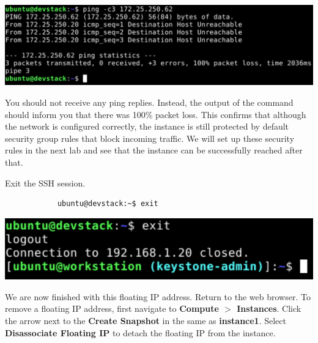 \documentclass[letterpaper, 12pt]{article}
\begin{document}
\begin{enumerate}
\begin{labstep}
        \begin{center}
            \includegraphics[width=\linewidth]{images/part3/step9.png}
        \end{center}
    \end{labstep}

    \begin{notebox}
        You should not receive any ping replies.
        Instead, the output of the command should inform you that there was 100\% packet loss.
        This confirms that although the network is configured correctly, the instance is still protected by default security group rules that block incoming traffic.
        We will set up these security rules in the next lab and see that the instance can be successfully reached after that.
    \end{notebox}

    \begin{labstep}
        Exit the SSH session.
        \begin{lstlisting}
            ubuntu@devstack:~$ exit
        \end{lstlisting}

        \begin{center}
            \includegraphics[width=\linewidth]{images/part3/step10.png}
        \end{center}
    \end{labstep}

    \begin{labstep}
        We are now finished with this floating IP address.
        Return to the web browser.
        To remove a floating IP address, first navigate to \textbf{Compute $>$ Instances}.
        Click the arrow next to the \textbf{Create Snapshot} in the same as \textbf{instance1}.
        Select \textbf{Disassociate Floating IP} to detach the floating IP from the instance.


\end{labstep}
\end{enumerate}
\end{document}
